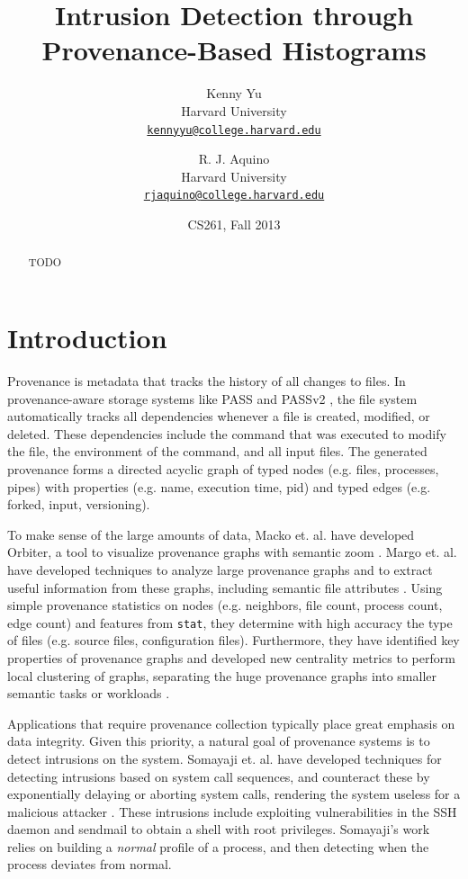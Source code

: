 \documentclass[10pt,twocolumn]{article}
\title{{\bf Intrusion Detection through Provenance-Based Histograms}}
\author{
    Kenny Yu\\
    Harvard University\\
    \href{mailto:kennyyu@college.harvard.edu}{\texttt{kennyyu@college.harvard.edu}}
  \and
    R. J. Aquino\\
    Harvard University\\
    \href{mailto:rjaquino@college.harvard.edu}{\texttt{rjaquino@college.harvard.edu}}
}
\date{CS261, Fall 2013}
\begin{document}
\maketitle

%

\begin{abstract}
TODO
\end{abstract}

%

\section{Introduction}
Provenance is metadata that tracks the history of all changes to files. In provenance-aware storage systems like PASS \cite{pass} and PASSv2 \cite{passv2}, the file system automatically tracks all dependencies whenever a file is created, modified, or deleted. These dependencies include the command that was executed to modify the file, the environment of the command, and all input files. The generated provenance forms a directed acyclic graph of typed nodes (e.g. files, processes, pipes) with properties (e.g. name, execution time, pid) and typed edges (e.g. forked, input, versioning). 

To make sense of the large amounts of data, Macko et. al. have developed Orbiter, a tool to visualize provenance graphs with semantic zoom \cite{orbiter}. Margo et. al. have developed techniques to analyze large provenance graphs and to extract useful information from these graphs, including semantic file attributes \cite{fileattributes}. Using simple provenance statistics on nodes (e.g. neighbors, file count, process count, edge count) and features from \texttt{stat}, they determine with high accuracy the type of files (e.g. source files, configuration files). Furthermore, they have identified key properties of provenance graphs and developed new centrality metrics to perform local clustering of graphs, separating the huge provenance graphs into smaller semantic tasks or workloads \cite{clustering}.

Applications that require provenance collection typically place great emphasis on data integrity. Given this priority, a natural goal of provenance systems is to detect intrusions on the system. Somayaji et. al. have developed techniques for detecting intrusions based on system call sequences, and counteract these by exponentially delaying or aborting system calls, rendering the system useless for a malicious attacker \cite{somayaji}\cite{somayaji-recent}. These intrusions include exploiting vulnerabilities in the SSH daemon and sendmail to obtain a shell with root privileges. Somayaji's work relies on building a {\em normal} profile of a process, and then detecting when the process deviates from normal.
\end{document}
